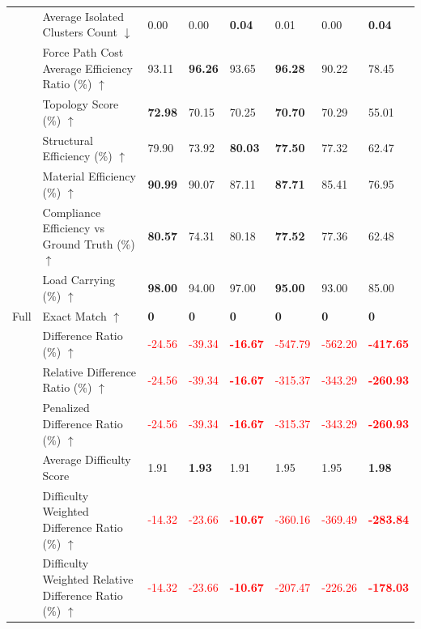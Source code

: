 \begin{table}[!h]
{\begin{tabular}{lllll|lll}
 & Average Isolated Clusters Count $\downarrow$ & 0.00 & 0.00 & \textbf{0.04} & 0.01 & 0.00 & \textbf{0.04} \\
 & Force Path Cost Average Efficiency Ratio (\%) $\uparrow$ & 93.11 & \textbf{96.26} & 93.65 & \textbf{96.28} & 90.22 & 78.45 \\
 & Topology Score (\%) $\uparrow$ & \textbf{72.98} & 70.15 & 70.25 & \textbf{70.70} & 70.29 & 55.01 \\
 & Structural Efficiency (\%) $\uparrow$ & 79.90 & 73.92 & \textbf{80.03} & \textbf{77.50} & 77.32 & 62.47 \\
 & Material Efficiency (\%) $\uparrow$ & \textbf{90.99} & 90.07 & 87.11 & \textbf{87.71} & 85.41 & 76.95 \\
 & Compliance Efficiency vs Ground Truth (\%) $\uparrow$ & \textbf{80.57} & 74.31 & 80.18 & \textbf{77.52} & 77.36 & 62.48 \\
 & Load Carrying (\%) $\uparrow$ & \textbf{98.00} & 94.00 & 97.00 & \textbf{95.00} & 93.00 & 85.00 \\
\midrule
Full & Exact Match $\uparrow$ & \textbf{0} & \textbf{0} & \textbf{0} & \textbf{0} & \textbf{0} & \textbf{0} \\
 & Difference Ratio (\%) $\uparrow$ & \textcolor{red}{-24.56} & \textcolor{red}{-39.34} & \textbf{\textcolor{red}{-16.67}} & \textcolor{red}{-547.79} & \textcolor{red}{-562.20} & \textbf{\textcolor{red}{-417.65}} \\
 & Relative Difference Ratio (\%) $\uparrow$ & \textcolor{red}{-24.56} & \textcolor{red}{-39.34} & \textbf{\textcolor{red}{-16.67}} & \textcolor{red}{-315.37} & \textcolor{red}{-343.29} & \textbf{\textcolor{red}{-260.93}} \\
 & Penalized Difference Ratio (\%) $\uparrow$ & \textcolor{red}{-24.56} & \textcolor{red}{-39.34} & \textbf{\textcolor{red}{-16.67}} & \textcolor{red}{-315.37} & \textcolor{red}{-343.29} & \textbf{\textcolor{red}{-260.93}} \\
 & Average Difficulty Score & 1.91 & \textbf{1.93} & 1.91 & 1.95 & 1.95 & \textbf{1.98} \\
 & Difficulty Weighted Difference Ratio (\%) $\uparrow$ & \textcolor{red}{-14.32} & \textcolor{red}{-23.66} & \textbf{\textcolor{red}{-10.67}} & \textcolor{red}{-360.16} & \textcolor{red}{-369.49} & \textbf{\textcolor{red}{-283.84}} \\
 & Difficulty Weighted Relative Difference Ratio (\%) $\uparrow$ & \textcolor{red}{-14.32} & \textcolor{red}{-23.66} & \textbf{\textcolor{red}{-10.67}} & \textcolor{red}{-207.47} & \textcolor{red}{-226.26} & \textbf{\textcolor{red}{-178.03}} \\

\end{tabular}}
\end{table}

